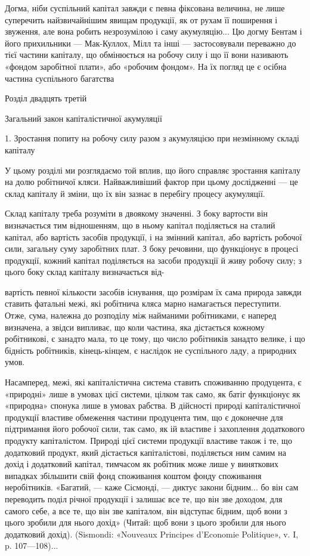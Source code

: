 Догма, ніби суспільний капітал завжди є певна фіксована величина,
не лише суперечить найзвичайнішим явищам продукції, як от рухам її
поширення і звуження, але вона робить незрозумілою і саму акумуляцію...
Цю догму Бентам і його прихильники — Мак-Куллох, Мілл та інші —
застосовували переважно до тієї частини капіталу, що обмінюється на
робочу силу і що її вони називають «фондом заробітної плати», або «робочим
фондом». На їх погляд це є осібна частина суспільного багатства

Розділ двадцять третій

Загальний закон капіталістичної акумуляції

1. Зростання попиту на робочу силу разом з акумуляцією
при незмінному складі капіталу

У цьому розділі ми розглядаємо той вплив, що його справляє
зростання капіталу на долю робітничої кляси. Найважливіший
фактор при цьому дослідженні — це склад капіталу й зміни,
що їх він зазнає в перебігу процесу акумуляції.

Склад капіталу треба розуміти в двоякому значенні. З боку
вартости він визначається тим відношенням, що в ньому капітал
поділяється на сталий капітал, або вартість засобів продукції,
і на змінний капітал, або вартість робочої сили, загальну суму
заробітних плат. З боку речовини, що функціонує в процесі
продукції, кожний капітал поділяється на засоби продукції й
живу робочу силу; з цього боку склад капіталу визначається від-

вартість певної кількости засобів існування, що розмірам їх сама природа
завжди ставить фатальні межі, які робітнича кляса марно намагається
переступити. Отже, сума, належна до розподілу між найманими робітниками,
є наперед визначена, а звідси випливає, що коли частина, яка
дістається кожному робітникові, є занадто мала, то це тому, що число
робітників занадто велике, і що бідність робітників, кінець-кінцем,
є наслідок не суспільного ладу, а природних умов.

Насамперед, межі, які капіталістична система ставить споживанню
продуцента, є «природні» лише в умовах цієї системи, цілком так
само, як батіг функціонує як «природна» спонука лише в умовах рабства.
В дійсності природі капіталістичної продукції властиве обмеження
частини продуцента тим, що є доконечне для підтримання його робочої
сили, так само, як ій властиве і захоплення додаткового продукту
капіталістом. Природі цієї системи продукції властиве також і те, що
додатковий продукт, який дістається капіталістові, поділяється ним
самим на дохід і додатковий капітал, тимчасом як робітник може лише
у виняткових випадках збільшити свій фонд споживання коштом фонду
споживання неробітників. «Багатий, — каже Сісмонді, — диктує закони
бідним... бо він сам переводить поділ річної продукції і залишає все
те, що він зве доходом, для самого себе, а все те, що він зве капіталом,
він відступає бідним, щоб вони з цього зробили для нього дохід» (Читай:
щоб вони з цього зробили для нього додатковий дохід). (Sismondi: «Nouveaux
Principes d’Economie Politique», v. I, p. 107—108)...

